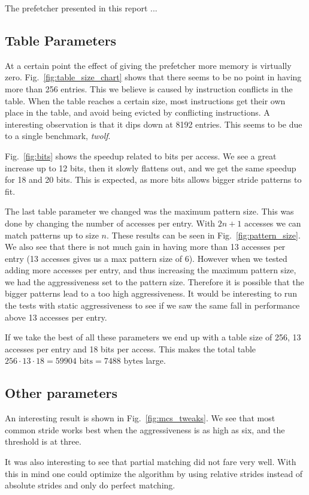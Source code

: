 The prefetcher presented in this report ...

\subsection{Table Parameters}
At a certain point the effect of giving the prefetcher more memory is virtually
zero. Fig.~\ref{fig:table_size_chart} shows that there seems to be no point in
having more than 256 entries. This we believe is caused by instruction
conflicts in the table. When the table reaches a certain size, most
instructions get their own place in the table, and avoid being evicted by
conflicting instructions.
A interesting observation is that it dips down at 8192 entries. This seems
to be due to a single benchmark, \emph{twolf}.

Fig.~\ref{fig:bits} shows the speedup related to bits per access.
We see a great increase up to 12 bits, then it slowly flattens out,
and we get the same speedup for 18 and 20 bits.
This is expected, as more bits allows bigger stride patterns to fit.

The last table parameter we changed was the maximum pattern size.
This was done by changing the number of accesses per entry.
With $2n+1$ accesses we can match patterns up to size $n$.
These results can be seen in Fig.~\ref{fig:pattern_size}.
We also see that there is not much gain in having more than 13
accesses per entry (13 accesses gives us a max pattern size of 6).
However when we tested adding more accesses per entry, and thus
increasing the maximum pattern size, we had the aggressiveness
set to the pattern size. Therefore it is possible that the bigger
patterns lead to a too high aggressiveness. It would be interesting
to run the tests with static aggressiveness to see if we saw the
same fall in performance above 13 accesses
per entry.

If we take the best of all these parameters we end up with a table size
of 256, 13 accesses per entry and 18 bits per access. This makes
the total table $256 \cdot 13 \cdot 18 = 59904 \textrm{ bits} = 7488 \textrm{ bytes}$ large.

\subsection{Other parameters}
An interesting result is shown in Fig.~\ref{fig:mcs_tweaks}.
We see that most common stride works best when the aggressiveness
is as high as six, and the threshold is at three.

It was also interesting to see that partial matching did not fare very well.
With this in mind one could optimize the algorithm by using relative strides
instead of absolute strides and only do perfect matching.
